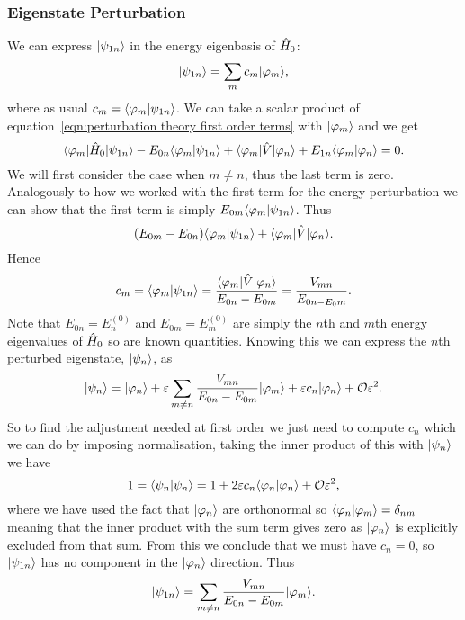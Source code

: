 \subsubsection{Eigenstate Perturbation}
We can express \(\vert {\psi_{1n}} \rangle\) in the energy eigenbasis of \(\hat{H}_0\):
\[\vert {\psi_{1n}} \rangle = \sum_{m}c_m\vert {\varphi_m} \rangle,\]
where as usual \(c_m = \langle {\varphi_m} \vert {\psi_{1n}} \rangle\).
We can take a scalar product of equation~\ref{eqn:perturbation theory first order terms} with \(\vert {\varphi_m} \rangle\) and we get
\[\langle {\varphi_m} \vert\hat{H}_0\vert {\psi_{1n}} \rangle - E_{0n}\langle {\varphi_m} \vert {\psi_{1n}} \rangle + \langle {\varphi_m} \vert\hat{V}\vert {\varphi_n} \rangle + E_{1n}\langle {\varphi_m} \vert {\varphi_n} \rangle = 0.\]
We will first consider the case when \(m \ne n\), thus the last term is zero.
Analogously to how we worked with the first term for the energy perturbation we can show that the first term is simply \(E_{0m}\langle {\varphi_m} \vert {\psi_{1n}} \rangle\).
Thus
\[(E_{0m} - E_{0n})\langle {\varphi_m} \vert {\psi_{1n}} \rangle + \langle {\varphi_m} \vert\hat{V}\vert {\varphi_n} \rangle.\]
Hence
\[c_m = \langle {\varphi_m} \vert {\psi_{1n}} \rangle = \frac{\langle {\varphi_m} \vert\hat{V}\vert {\varphi_n} \rangle}{E_{0n} - E_{0m}} = \frac{V_{mn}}{E_{0n - E_0m}}.\]
Note that \(E_{0n} = E_n^{(0)}\) and \(E_{0m} = E_m^{(0)}\) are simply the \(n\)th and \(m\)th energy eigenvalues of \(\hat{H}_0\) so are known quantities.
Knowing this we can express the \(n\)th perturbed eigenstate, \(\vert {\psi_{n}} \rangle\), as
\[\vert {\psi_{n}} \rangle = \vert {\varphi_n} \rangle + \varepsilon\sum_{m\ne n}\frac{V_{mn}}{E_{0n} - E_{0m}}\vert {\varphi_m} \rangle + \varepsilon c_n\vert {\varphi_n} \rangle + \mathcal{O}{\varepsilon^2}.\]
So to find the adjustment needed at first order we just need to compute \(c_n\) which we can do by imposing normalisation, taking the inner product of this with \(\vert {\psi_{n}} \rangle\) we have
\[1 = \langle {\psi_{n}} \vert {\psi_{n}} \rangle = 1 + 2\varepsilon c_n\langle {\varphi_n} \vert {\varphi_n} \rangle + \mathcal{O}{\varepsilon^2},\]
where we have used the fact that \(\vert {\varphi_n} \rangle\) are orthonormal so \(\langle {\varphi_n} \vert {\varphi_m} \rangle = \delta_{nm}\) meaning that the inner product with the sum term gives zero as \(\vert {\varphi_n} \rangle\) is explicitly excluded from that sum.
From this we conclude that we must have \(c_n = 0\), so \(\vert {\psi_{1n}} \rangle\) has no component in the \(\vert {\varphi_n} \rangle\) direction.
Thus
\[\vert {\psi_{1n}} \rangle = \sum_{m\ne n} \frac{V_{mn}}{E_{0n} - E_{0m}}\vert {\varphi_m} \rangle.\]

